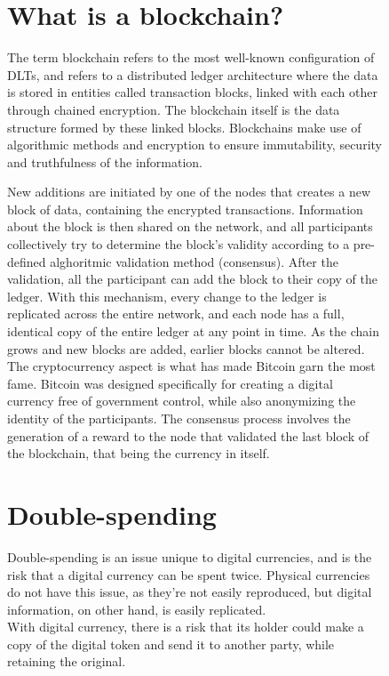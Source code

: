 \begin{figure}[h]
    \begin{tcolorbox}[colframe=boxcolor]
        \section*{What is a blockchain?}
        The term blockchain refers to the most well-known configuration of DLTs, and refers to a distributed ledger architecture where the data is stored in entities called transaction blocks, linked with each other through chained encryption. The blockchain itself is the data structure formed by these linked blocks. Blockchains make use of algorithmic methods and encryption to ensure immutability, security and truthfulness of the information.
        
        New additions are initiated by one of the nodes that creates a new block of data, containing the encrypted transactions. Information about the block is then shared on the network, and all participants collectively try to determine the block's validity according to a pre-defined alghoritmic validation method (consensus). After the validation, all the participant can add the block to their copy of the ledger. With this mechanism, every change to the ledger is replicated across the entire network, and each node has a full, identical copy of the entire ledger at any point in time. As the chain grows and new blocks are added, earlier blocks cannot be altered. \\

        The cryptocurrency aspect is what has made Bitcoin garn the most fame. Bitcoin was designed specifically for creating a digital currency free of government control, while also anonymizing the identity of the participants.
        The consensus process involves the generation of a reward to the node that validated the last block of the blockchain, that being the currency in itself. 
    \end{tcolorbox}
\end{figure}

\begin{figure}[h]
    \begin{tcolorbox}[colframe=boxcolor]
        \section*{Double-spending}
        Double-spending is an issue unique to digital currencies, and is the risk that a digital currency can be spent twice. Physical currencies do not have this issue, as they're not easily reproduced, but digital information, on other hand, is easily replicated. \\

        With digital currency, there is a risk that its holder could make a copy of the digital token and send it to another party, while retaining the original. 
        
    \end{tcolorbox}
\end{figure}
\newpage

